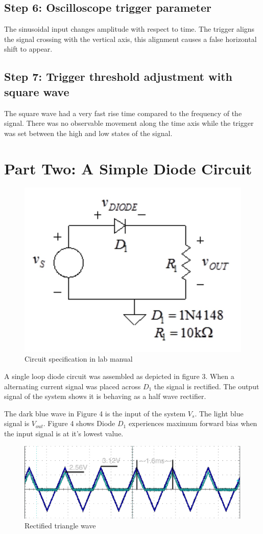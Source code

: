 \documentclass[11pt,journal]{IEEEtran}
\begin{document}
	\subsection{Step 6: Oscilloscope trigger parameter}
		The sinusoidal input changes amplitude with respect to time. The trigger aligns the signal crossing with the vertical axis, this alignment causes a false horizontal shift to appear.
	
	\subsection{Step 7: Trigger threshold adjustment with square wave}
		The square wave had a very fast rise time compared to the frequency of the signal. There was no observable movement along the time axis while the
		trigger was set between the high and low states of the signal.
	
	\section{Part Two: A Simple Diode Circuit}	
		\begin{figure}
			\includegraphics[width=.25\textwidth]{screenshot_27}
			\caption{Circuit specification in lab manual}
		\end{figure}
		A single loop diode circuit was assembled as depicted in figure 3. When a alternating current signal was placed across $D_1$ the signal is rectified. The output signal of the system
		shows it is behaving as a half wave rectifier.
		
		The dark blue wave in Figure 4 is the input of the system $V_s$. The light blue signal is $V_{out}$. Figure 4 shows Diode $D_1$ experiences maximum forward bias when the input signal is at it's lowest value.
			
	\begin{figure}
		\includegraphics[width=.5\textwidth]{screenshot_26}
		\caption{Rectified triangle wave}
	\end{figure}
	
\end{document}
